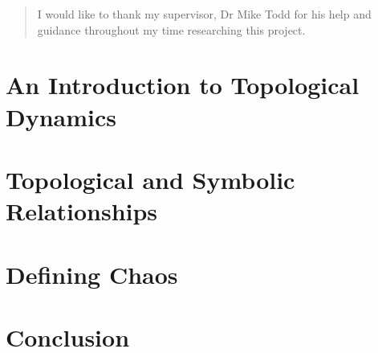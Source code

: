 \documentclass[11pt,a4paper,oneside]{memoir}
\theoremstyle{plain}
\theoremstyle{definition}
\begin{document}
\vspace{2cm}

\renewcommand{\abstractname}{Acknowledgements}
\begin{abstract}
    \noindent I would like to thank my supervisor, Dr Mike Todd for his help and guidance throughout my time researching this project.
\end{abstract}

\newpage
\tableofcontents

\chapter{An Introduction to Topological Dynamics} \label{chap:introduction}


\chapter{Topological and Symbolic Relationships} \label{chap:conjugacy-symbol-dynamics}


\chapter{Defining Chaos} \label{chap:defining-chaos}


\chapter{Conclusion} \label{chap:conclusion}



\end{document}
